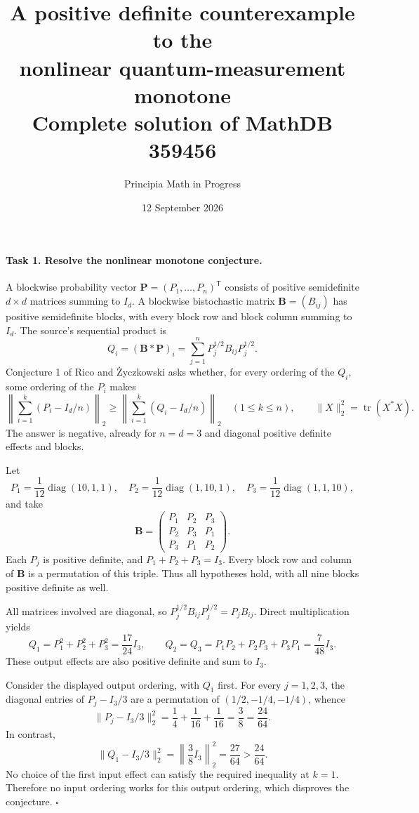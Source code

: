 \documentclass[11pt]{article}
\title{A positive definite counterexample to the\\
nonlinear quantum-measurement monotone\\
\large Complete solution of MathDB 359456}
\author{Principia Math in Progress}
\date{12 September 2026}
\newcommand{\Tr}{\operatorname{tr}}
\begin{document}
\maketitle

\paragraph{Task 1. Resolve the nonlinear monotone conjecture.}
A blockwise probability vector $\boldsymbol P=(P_1,\ldots,P_n)^{\mathsf T}$
consists of positive semidefinite $d\times d$ matrices summing to $I_d$.
A blockwise bistochastic matrix $\boldsymbol B=(B_{ij})$ has positive
semidefinite blocks, with every block row and block column summing to
$I_d$. The source's sequential product is
\[
 Q_i=(\boldsymbol B*\boldsymbol P)_i
       =\sum_{j=1}^n P_j^{1/2}B_{ij}P_j^{1/2}.
\]
Conjecture 1 of Rico and \.{Z}yczkowski asks whether, for every ordering
of the $Q_i$, some ordering of the $P_i$ makes
\[
 \left\|\sum_{i=1}^k(P_i-I_d/n)\right\|_2
 \geq
 \left\|\sum_{i=1}^k(Q_i-I_d/n)\right\|_2
 \quad(1\leq k\leq n),
 \qquad \|X\|_2^2=\Tr(X^*X).
\]
The answer is negative, already for $n=d=3$ and diagonal positive
definite effects and blocks.

Let
\[
 P_1=\frac1{12}\operatorname{diag}(10,1,1),\quad
 P_2=\frac1{12}\operatorname{diag}(1,10,1),\quad
 P_3=\frac1{12}\operatorname{diag}(1,1,10),
\]
and take
\[
 \boldsymbol B=
 \begin{pmatrix}
  P_1&P_2&P_3\\
  P_2&P_3&P_1\\
  P_3&P_1&P_2
 \end{pmatrix}.
\]
Each $P_j$ is positive definite, and $P_1+P_2+P_3=I_3$.
Every block row and column of $\boldsymbol B$ is a permutation of
this triple. Thus all hypotheses hold, with all nine blocks positive
definite as well.

All matrices involved are diagonal, so
$P_j^{1/2}B_{ij}P_j^{1/2}=P_jB_{ij}$. Direct multiplication yields
\[
 Q_1=P_1^2+P_2^2+P_3^2=\frac{17}{24}I_3,\qquad
 Q_2=Q_3=P_1P_2+P_2P_3+P_3P_1=\frac7{48}I_3.
\]
These output effects are also positive definite and sum to $I_3$.

Consider the displayed output ordering, with $Q_1$ first.
For every $j=1,2,3$, the diagonal entries of $P_j-I_3/3$
are a permutation of $(1/2,-1/4,-1/4)$, whence
\[
 \|P_j-I_3/3\|_2^2
 =\frac14+\frac1{16}+\frac1{16}
 =\frac38=\frac{24}{64}.
\]
In contrast,
\[
 \|Q_1-I_3/3\|_2^2
 =\left\|\frac38I_3\right\|_2^2
 =\frac{27}{64}>\frac{24}{64}.
\]
No choice of the first input effect can satisfy the required inequality
at $k=1$. Therefore no input ordering works for this output ordering,
which disproves the conjecture. \hfill$\square$
\end{document}
